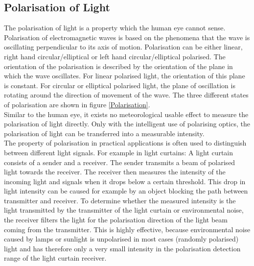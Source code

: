 \subsection{Polarisation of Light}
The polarisation of light is a property which the human eye cannot sense. Polarisation of electromagnetic waves is based on the phenomena that the wave is oscillating perpendicular to its axis of motion. Polarisation can be either linear, right hand circular/elliptical or left hand circular/elliptical polarised. The orientation of the polarisation is described by the orientation of the plane in which the wave oscillates. For linear polarised light, the orientation of this plane is constant. For circular or elliptical polarised light, the plane of oscillation is rotating around the direction of movement of the wave. The three different states of polarisation are shown in figure \ref{Polarisation}.\\
Similar to the human eye, it exists no meteorological usable effect to measure the polarisation of light directly. Only with the intelligent use of polarising optics, the polarisation of light can be transferred into a measurable intensity.\cite{LoefflerLang2020}\cite{hecht2002optics}\\
The property of polarisation in practical applications is often used to distinguish between different light signals. For example in light curtains: A light curtain consists of a sender and a receiver. The sender transmits a beam of polarised light towards the receiver. The receiver then measures the intensity of the incoming light and signals when it drops below a certain threshold. This drop in light intensity can be caused for example by an object blocking the path between transmitter and receiver. To determine whether the measured intensity is the light transmitted by the transmitter of the light curtain or environmental noise, the receiver filters the light for the polarisation direction of the light beam coming from the transmitter. This is highly effective, because environmental noise caused by lamps or sunlight is unpolarised in most cases (randomly polarised) light and has therefore only a very small intensity in the polarisation detection range of the light curtain receiver.\cite{LoefflerLang2020}\cite{PilzLightBarrier}

